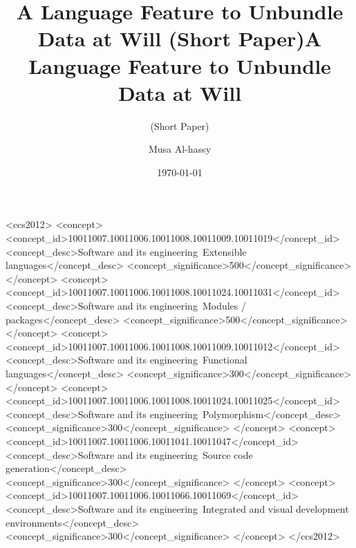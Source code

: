 \documentclass[sigplan,screen]{acmart}
\date{\today}
\title{A Language Feature to Unbundle Data at Will (Short Paper)}
\begin{document}



\begin{CCSXML}
<ccs2012>
<concept>
<concept_id>10011007.10011006.10011008.10011009.10011019</concept_id>
<concept_desc>Software and its engineering~Extensible languages</concept_desc>
<concept_significance>500</concept_significance>
</concept>
<concept>
<concept_id>10011007.10011006.10011008.10011024.10011031</concept_id>
<concept_desc>Software and its engineering~Modules / packages</concept_desc>
<concept_significance>500</concept_significance>
</concept>
<concept>
<concept_id>10011007.10011006.10011008.10011009.10011012</concept_id>
<concept_desc>Software and its engineering~Functional languages</concept_desc>
<concept_significance>300</concept_significance>
</concept>
<concept>
<concept_id>10011007.10011006.10011008.10011024.10011025</concept_id>
<concept_desc>Software and its engineering~Polymorphism</concept_desc>
<concept_significance>300</concept_significance>
</concept>
<concept>
<concept_id>10011007.10011006.10011041.10011047</concept_id>
<concept_desc>Software and its engineering~Source code generation</concept_desc>
<concept_significance>300</concept_significance>
</concept>
<concept>
<concept_id>10011007.10011006.10011066.10011069</concept_id>
<concept_desc>Software and its engineering~Integrated and visual development environments</concept_desc>
<concept_significance>300</concept_significance>
</concept>
</ccs2012>
\end{CCSXML}



 \title{A Language Feature to Unbundle Data at Will}
\subtitle{ (Short Paper)}

 \author{Musa Al-hassy}
\end{document}
